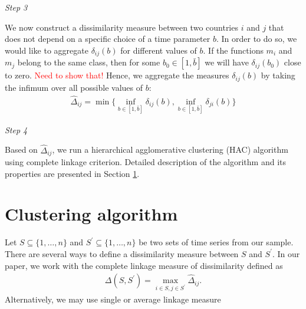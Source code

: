 \documentclass[a4paper,11pt]{article}
\numberwithin{equation}{section}
\begin{document}

\textit{Step 3}

We now construct a dissimilarity measure between two countries $i$ and $j$ that does not depend on a specific choice of a time parameter $b$. In order to do so, we would like to aggregate $\delta_{ij}(b)$ for different values of $b$. %
If the functions $m_i$ and $m_j$ belong to the same class, then for some $b_0\in [1, \bar{b}]$ we will have $\delta_{ij}(b_0)$ close to zero. \textcolor{red}{Need to show that!} Hence, we aggregate the measures $\delta_{ij} (b)$ by taking the infimum over all possible values of $b$:
\begin{align*}
	\widehat{\Delta}_{ij} = \min \{ \inf_{b\in [1, \bar{b}]} \delta_{ij}(b), \inf_{b\in [1, \bar{b}]} \delta_{ji}(b) \}
\end{align*}

\textit{Step 4}

Based on $\widehat{\Delta}_{ij}$, we run a hierarchical agglomerative clustering (HAC) algorithm using complete linkage criterion. Detailed description of the algorithm and its properties are presented in Section \ref{sec:alg}.

\section{Clustering algorithm}\label{sec:alg}

Let $S \subseteq \{1, \ldots, n\}$ and $S^\prime \subseteq \{1, \ldots, n\}$ be two sets of time series from our sample. There are several ways to define a dissimilarity measure between $S$ and $S^\prime$. In our paper, we work with the complete linkage measure of dissimilarity defined as 
\begin{align*}
\Delta (S, S^\prime) = \max_{i \in S, j\in S^\prime} \widehat{\Delta}_{ij}.
\end{align*}
Alternatively, we may use single or average linkage measure 
\end{document}
